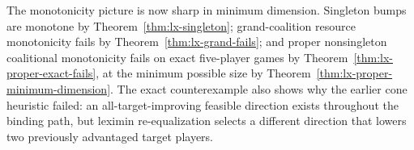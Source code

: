 \begin{remark}
The monotonicity picture is now sharp in minimum dimension.  Singleton bumps are monotone by
Theorem~\ref{thm:lx-singleton}; grand-coalition resource monotonicity fails by
Theorem~\ref{thm:lx-grand-fails}; and proper nonsingleton coalitional
monotonicity fails on exact five-player games by
Theorem~\ref{thm:lx-proper-exact-fails}, at the minimum possible size by
Theorem~\ref{thm:lx-proper-minimum-dimension}.  The exact counterexample also
shows why the earlier cone heuristic failed: an all-target-improving feasible
direction exists throughout the binding path, but leximin re-equalization
selects a different direction that lowers two previously advantaged target
players.
\end{remark}

